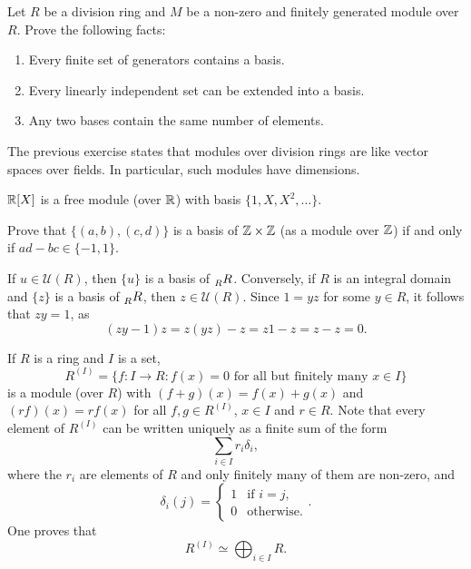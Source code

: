 \begin{exercise}
\label{xca:linear_algebra}
    Let $R$ be a division ring and $M$ be a non-zero and finitely generated module over $R$.
    Prove the following facts:
    \begin{enumerate}
        \item Every finite set of generators contains a basis.
        \item Every linearly independent set can be extended into a basis.
        \item Any two bases contain the same number of elements.
    \end{enumerate}
\end{exercise}

The previous exercise states that modules over division rings 
are like vector spaces over fields. In particular, 
such modules have dimensions.

\begin{example}
    $\mathbb{R}[X]$ is a free module (over $\mathbb{R}$) with basis $\{1,X,X^2,\dots\}$. 
\end{example}

\begin{exercise}
    Prove that $\{(a,b),(c,d)\}$ is a basis of $\mathbb{Z}\times\mathbb{Z}$ 
    (as a module over $\mathbb{Z}$) if and only if
    $ad-bc\in\{-1,1\}$. 
\end{exercise}

\begin{example}
If $u\in\mathcal{U}(R)$, then $\{u\}$ is a basis of $\prescript{}{R}R$. Conversely, if $R$ is an integral domain and 
$\{z\}$ is a basis of $\prescript{}{R}R$, then $z\in\mathcal{U}(R)$. Since 
$1=yz$ for some $y\in R$, it follows that $zy=1$, as  
\[
(zy-1)z=z(yz)-z=z1-z=z-z=0.
\]	
\end{example}

If $R$ is a ring and $I$ is a set, 
\[
R^{(I)}=\{f\colon I\to R:f(x)=0\text{ for all but finitely many $x\in I$}\}
\]
is a module (over $R$) with 
$(f+g)(x)=f(x)+g(x)$ and $(rf)(x)=rf(x)$ for all $f,g\in R^{(I)}$, $x\in I$ and $r\in R$. 
Note that 
every element 
of $R^{(I)}$ can be written uniquely as
a finite sum of the form 
\[
\sum_{i\in I}r_i\delta_i,
\]
where the $r_i$ are elements of $R$ and only finitely many of them are non-zero, and 
\[
\delta_i(j)=\begin{cases}
1 & \text{if $i=j$},\\
0 & \text{otherwise}.
\end{cases}.
\]
One proves
that
\[
R^{(I)}\simeq\bigoplus_{i\in I}R.
\]

